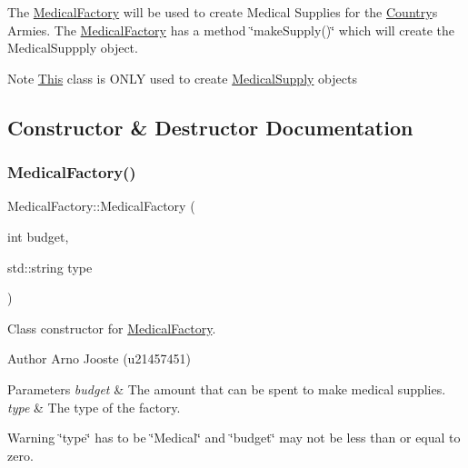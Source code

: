 The \mbox{\hyperlink{class_medical_factory}{Medical\+Factory}} will be used to create Medical Supplies for the \mbox{\hyperlink{class_country}{Country}}\textquotesingle{}s Armies. The \mbox{\hyperlink{class_medical_factory}{Medical\+Factory}} has a method \char`\"{}make\+Supply()\char`\"{} which will create the Medical\+Suppply object. \begin{DoxyNote}{Note}
\mbox{\hyperlink{class_this}{This}} class is O\+N\+LY used to create \mbox{\hyperlink{class_medical_supply}{Medical\+Supply}} objects 
\end{DoxyNote}


\subsection{Constructor \& Destructor Documentation}
\mbox{\label{class_medical_factory_a4f870a142a0af80b8ae7beffed25c436}} 
\subsubsection{\texorpdfstring{MedicalFactory()}{MedicalFactory()}}
{\footnotesize\ttfamily Medical\+Factory\+::\+Medical\+Factory (\begin{DoxyParamCaption}\item[{int}]{budget,  }\item[{std\+::string}]{type }\end{DoxyParamCaption})}



Class constructor for \mbox{\hyperlink{class_medical_factory}{Medical\+Factory}}. 

\begin{DoxyAuthor}{Author}
Arno Jooste (u21457451) 
\end{DoxyAuthor}

\begin{DoxyParams}{Parameters}
{\em budget} & The amount that can be spent to make medical supplies. \\
\hline
{\em type} & The type of the factory. \\
\hline
\end{DoxyParams}
\begin{DoxyWarning}{Warning}
\char`\"{}type\char`\"{} has to be \char`\"{}\+Medical\char`\"{} and \char`\"{}budget\char`\"{} may not be less than or equal to zero. 
\end{DoxyWarning}



